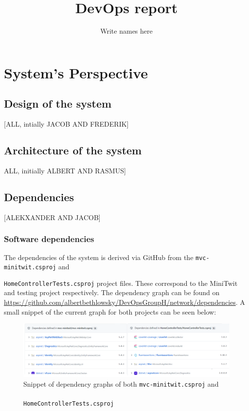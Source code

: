 \documentclass{article}
\title{DevOps report}
\author{Write names here}
\begin{document}
\maketitle

\section{System's Perspective}
\subsection{Design of the system} [ALL, intially JACOB AND FREDERIK]
\subsection{Architecture of the system} ALL, initially ALBERT AND RASMUS]
\subsection{Dependencies} [ALEKXANDER AND JACOB] \\
\subsubsection{Software dependencies}
The dependencies of the system is derived via GitHub from the \texttt{mvc-minitwit.csproj} 
and 

\texttt{HomeControllerTests.csproj} project files. These correspond to the MiniTwit and testing project respectively. The dependency graph can be found on \url{https://github.com/albertbethlowsky/DevOpsGroupH/network/dependencies}. A small snippet of the current graph for both projects can be seen below:
\begin{figure}[H]
\centering
\includegraphics[width=1.1\textwidth]{images/dependencies-snip.png}
\caption{\label{fig:dep1}Snippet of dependency graphs of both \texttt{mvc-minitwit.csproj} and \\\\ \texttt{HomeControllerTests.csproj}}
\end{figure}
\end{document}

